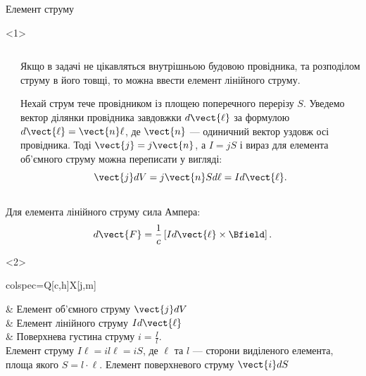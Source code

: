 \documentclass{beamer}
\begin{document}
\begin{frame}{Елемент струму}{}
	\begin{onlyenv}
		\begin{columns}
			\begin{column}{0.3\linewidth}\centering
				
			\end{column}
			\begin{column}{0.7\linewidth}
				\begin{block}{}\justifying
					Якщо в задачі не цікавляться
					внутрішньою будовою провідника, та розподілом струму в його товщі, то можна ввести \alert{елемент лінійного струму}.
				\end{block}
				\begin{block}{}\justifying
					Нехай струм тече провідником із площею поперечного перерізу $S$. Уведемо вектор ділянки провідника завдовжки $d\vect{\ell}$
					за формулою $d\vect{\ell} = \vect{n}\ell$, де $\vect{n}$ --- одиничний вектор уздовж осі провідника. Тоді $\vect{j} = j\vect{n}$,
					а $I = j S$ і вираз для елемента об'ємного струму можна переписати у вигляді:
					\begin{equation*}
						\vect{j}dV = j\vect{n} S d\ell  = I d\vect{\ell}.
					\end{equation*}
				\end{block}
			\end{column}
		\end{columns}
		\begin{block}{}
			Для елемента лінійного струму сила Ампера:
			\begin{equation*}
				d\vect{F} = \frac1c \left[ I d\vect{\ell} \times \Bfield\right].
			\end{equation*}
		\end{block}
	\end{onlyenv}
	\begin{onlyenv}
		\begin{tblr}{
			colspec={Q[c,h]X[j,m]}
			}
			
			 &
			Елемент об'ємного струму $\vect{j}dV$
			\\
			
			 &
			Елемент лінійного струму $Id\vect{\ell}$
			\\
			
			 &
			{
			Поверхнева густина струму $i = \frac{I}{l}$. \\
					Елемент струму $I\ell = il\ell = i S$, де $\ell$ та $l$ --- сторони виділеного елемента, площа якого $S = l\cdot \ell$.
					Елемент поверхневого струму $\vect{i}dS$
				}
		\end{tblr}
	\end{onlyenv}
\end{frame}
\end{document}
